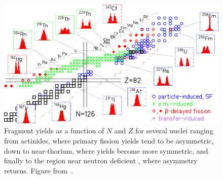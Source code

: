 

\begin{figure}
	\centering
	\includegraphics[width=0.9\linewidth]{./TeX_files/178Pt_region}
	\caption[Fragment yields as a function of $N$ and $Z$ for several nuclei ranging from actinides, where primary fission yields tend to be asymmetric, down to near-thorium, where yields become more symmetric, and finally to the region near neutron deficient {\Hg}, where asymmetry returns.]{Fragment yields as a function of $N$ and $Z$ for several nuclei ranging from actinides, where primary fission yields tend to be asymmetric, down to near-thorium, where yields become more symmetric, and finally to the region near neutron deficient {\Hg}, where asymmetry returns. Figure from~\cite{Andreyev2018}.}
	\label{fig:178ptregion}
\end{figure}



